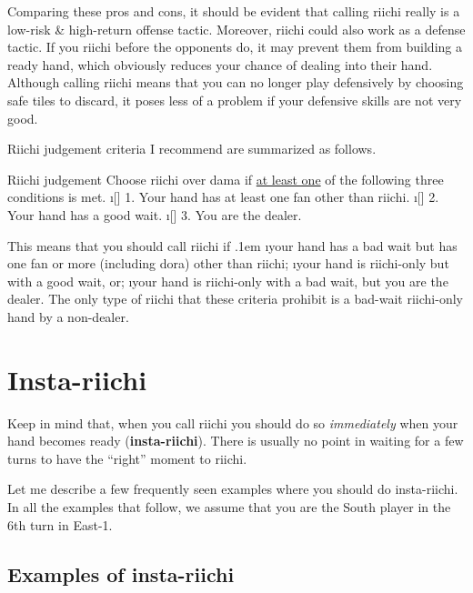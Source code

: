 \bigskip
\noindent
Comparing these pros and cons, it should be evident that calling {\jap riichi} really is a low-risk \& high-return offense tactic. Moreover, {\jap riichi} could also work as a defense tactic. If you {\jap riichi} before the opponents do, it may prevent them from building a ready hand, which obviously reduces your chance of dealing into their hand. 
Although calling {\jap riichi} means that you can no longer play defensively by choosing safe tiles to discard, it poses less of a problem if your defensive skills are not very good. 

\bigskip

{\jap Riichi} judgement criteria I recommend are summarized as follows. 

\bigskip
\begin{itembox}[c]{{\jap Riichi} judgement}
Choose {\jap riichi} over {\jap dama} if \underline{\large at least one} of the following three conditions is met. 
\bi
\i[] 1. Your hand has at least one {\jap fan} other than {\jap riichi}.
\i[] 2. Your hand has a good wait.
\i[] 3. You are the dealer.
\ei \vsps
\end{itembox}

\newpage
\noindent This means that you should call {\jap riichi} if 
\bi \itemsep.1em
\i your hand has a bad wait but has one {\jap fan} or more (including {\jap dora}) other than {\jap riichi};
\i your hand is {\jap riichi}-only but with a good wait, or;
\i your hand is {\jap riichi}-only with a bad wait, but you are the dealer. 
\ei
The only type of {\jap riichi} that these criteria prohibit is a bad-wait {\jap riichi}-only hand by a non-dealer. 


\section{Insta-{\jap riichi}} 	
Keep in mind that, when you call {\jap riichi} you should do so \emph{immediately} when your hand becomes ready ({\bf insta-{\jap riichi}}). There is usually no point in waiting for a few turns to have the ``right'' moment to {\jap riichi}. 

\bigskip
Let me describe a few frequently seen examples where you should do insta-{\jap riichi}. 
In all the examples that follow, we assume that you are the South player in the 6th turn in East-1. 

\subsection{Examples of insta-{\jap riichi}}

